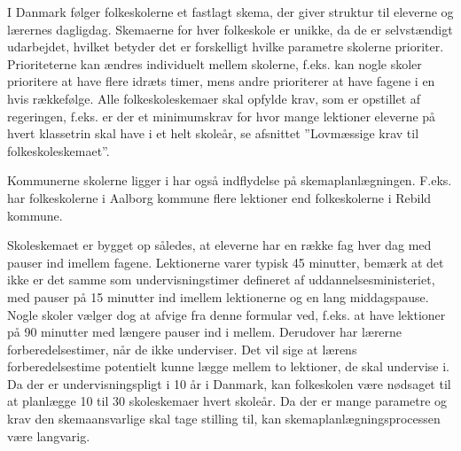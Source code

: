 I Danmark følger folkeskolerne et fastlagt skema, der giver struktur til eleverne og lærernes dagligdag. Skemaerne for hver folkeskole er unikke, da de er selvstændigt udarbejdet, hvilket betyder det er forskelligt hvilke parametre skolerne prioriter. Prioriteterne kan ændres individuelt mellem skolerne, f.eks. kan nogle skoler prioritere at have flere idræts timer, mens andre prioriterer at have fagene i en hvis rækkefølge. Alle folkeskoleskemaer skal opfylde krav, som er opstillet af regeringen, f.eks. er der et minimumskrav for hvor mange lektioner eleverne på hvert klassetrin skal have i et helt skoleår, se afsnittet ”Lovmæssige krav til folkeskoleskemaet”. 

Kommunerne skolerne ligger i har også indflydelse på skemaplanlægningen. F.eks. har folkeskolerne i Aalborg kommune flere lektioner end folkeskolerne i Rebild kommune. %

Skoleskemaet er bygget op således, at eleverne har en række fag hver dag med pauser ind imellem fagene. Lektionerne varer typisk 45 minutter, bemærk at det ikke er det samme som undervisningstimer defineret af uddannelsesministeriet, med pauser på 15 minutter ind imellem lektionerne og en lang middagspause. Nogle skoler vælger dog at afvige fra denne formular ved, f.eks. at have lektioner på 90 minutter med længere pauser ind i mellem. Derudover har lærerne forberedelsestimer, når de ikke underviser. Det vil sige at  lærens forberedelsestime potentielt kunne lægge mellem to lektioner, de skal undervise i. Da der er undervisningspligt i 10 år i Danmark, kan folkeskolen være nødsaget til at planlægge 10 til 30 skoleskemaer hvert skoleår. Da der er mange parametre og krav den skemaansvarlige skal tage stilling til, kan skemaplanlægningsprocessen være langvarig.